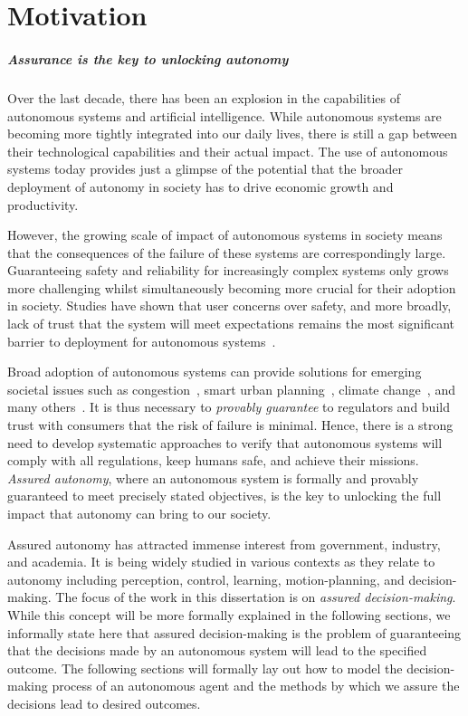 \chapter{Motivation}

\paragraph{Assurance is the key to unlocking autonomy} Over the last decade, there has been an explosion in the capabilities of autonomous systems and artificial intelligence. While autonomous systems are becoming more tightly integrated into our daily lives, there is still a gap between their technological capabilities and their actual impact. The use of autonomous systems today provides just a glimpse of the potential that the broader deployment of autonomy in society has to drive economic growth and productivity. 

However, the growing scale of impact of autonomous systems in society means that the consequences of the failure of these systems are correspondingly large. Guaranteeing safety and reliability for increasingly complex systems only grows more challenging whilst simultaneously becoming more crucial for their adoption in society. Studies have shown that user concerns over safety, and more broadly, lack of trust that the system will meet expectations remains the most significant barrier to deployment for autonomous systems~\cite{KAUR201887,BEZAI202165,MOLNAR2018319}.  

Broad adoption of autonomous systems can provide solutions for emerging societal issues such as congestion~\cite{LIORIS2017292,8734238}, smart urban planning~\cite{GULSRUD201885,NITOSLAWSKI2019101770}, climate change~\cite{KOLOKOTSA2017101,goddard2021global}, and many others~\cite{DUONG2020355}. It is thus necessary to \emph{provably guarantee} to regulators and build trust with consumers that the risk of failure is minimal. Hence, there is a strong need to develop systematic approaches to verify that autonomous systems will comply with all regulations, keep humans safe, and achieve their missions. \emph{Assured autonomy}, where an autonomous system is formally and provably guaranteed to meet precisely stated objectives, is the key to unlocking the full impact that autonomy can bring to our society. 

Assured autonomy has attracted immense interest from government, industry, and academia. It is being widely studied in various contexts as they relate to autonomy including perception, control, learning, motion-planning, and decision-making. The focus of the work in this dissertation is on \emph{assured decision-making}. While this concept will be more formally explained in the following sections, we informally state here that assured decision-making is the problem of guaranteeing that the decisions made by an autonomous system will lead to the specified outcome. The following sections will formally lay out how to model the decision-making process of an autonomous agent and the methods by which we assure the decisions lead to desired outcomes. 


